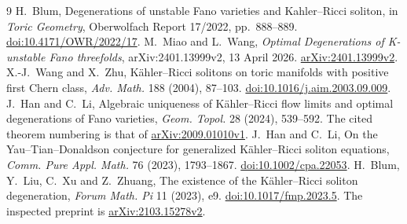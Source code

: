 \documentclass[11pt,a4paper]{article}
\begin{document}
\begin{thebibliography}{9}
H.~Blum, Degenerations of unstable Fano varieties and Kahler--Ricci soliton,
in \emph{Toric Geometry}, Oberwolfach Report 17/2022, pp.~888--889.
\href{https://doi.org/10.4171/OWR/2022/17}{doi:10.4171/OWR/2022/17}.
M.~Miao and L.~Wang, \emph{Optimal Degenerations of K-unstable Fano
threefolds}, arXiv:2401.13999v2, 13 April 2026.
\href{https://arxiv.org/abs/2401.13999v2}{arXiv:2401.13999v2}.
X.-J.~Wang and X.~Zhu, Kähler--Ricci solitons on toric manifolds with
positive first Chern class, \emph{Adv. Math.} 188 (2004), 87--103.
\href{https://doi.org/10.1016/j.aim.2003.09.009}{doi:10.1016/j.aim.2003.09.009}.
J.~Han and C.~Li, Algebraic uniqueness of Kähler--Ricci flow limits
and optimal degenerations of Fano varieties,
\emph{Geom. Topol.} 28 (2024), 539--592.
The cited theorem numbering is that of
\href{https://arxiv.org/abs/2009.01010v1}{arXiv:2009.01010v1}.
J.~Han and C.~Li, On the Yau--Tian--Donaldson conjecture for
generalized Kähler--Ricci soliton equations,
\emph{Comm. Pure Appl. Math.} 76 (2023), 1793--1867.
\href{https://doi.org/10.1002/cpa.22053}{doi:10.1002/cpa.22053}.
H.~Blum, Y.~Liu, C.~Xu and Z.~Zhuang, The existence of the
Kähler--Ricci soliton degeneration,
\emph{Forum Math. Pi} 11 (2023), e9.
\href{https://doi.org/10.1017/fmp.2023.5}{doi:10.1017/fmp.2023.5}.
The inspected preprint is
\href{https://arxiv.org/abs/2103.15278v2}{arXiv:2103.15278v2}.
\end{thebibliography}
\end{document}
